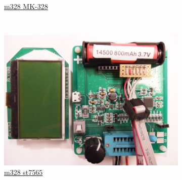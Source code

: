 \documentclass[pdftex,12pt,a4paper,english]{article}
\begin{document}
\begin{figure}[H]
\begin{subfigure}[b]{.3\textwidth}
	  \\ \vspace{-0.5em}
	  {\href{run:./trunk/mega328_MK-328/}{m328 MK-328}}
  \end{subfigure}
~
  \begin{subfigure}[b]{.3\textwidth}
    \centering
    \includegraphics[width=1.\textwidth]{../PNG/m328_wei_st7565.JPG}
	  \\ \vspace{-0.5em}
	  {\href{run:./trunk/mega328_wei_st7565/}{m328 st7565}}
  \end{subfigure}
\end{figure}
\vspace{-1em}
\end{document}
